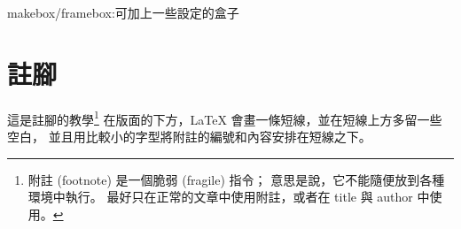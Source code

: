 makebox/framebox:可加上一些設定的盒子



\newpage
\section{註腳}
這是註腳的教學\footnote{附註 (footnote) 是一個脆弱 (fragile) 指令； 意思是說，它不能隨便放到各種環境中執行。 最好只在正常的文章中使用附註，或者在 title 與 author 中使用。}
在版面的下方，LaTeX 會畫一條短線，並在短線上方多留一些空白， 並且用比較小的字型將附註的編號和內容安排在短線之下。
\newpage